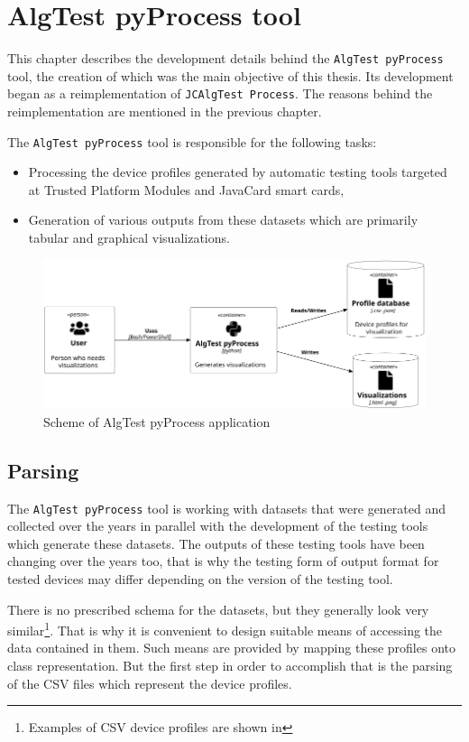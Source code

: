 \chapter{AlgTest pyProcess tool}
This chapter describes the development details behind the \texttt{AlgTest pyProcess} tool, the creation of which was the main objective of this thesis. Its development began as a reimplementation of \texttt{JCAlgTest Process}. The reasons behind the reimplementation are mentioned in the previous chapter.

The \texttt{AlgTest pyProcess} tool is responsible for the following tasks:
\begin{itemize}
    \item Processing the device profiles generated by automatic testing tools targeted at Trusted Platform Modules and JavaCard smart cards,
    \item Generation of various outputs from these datasets which are primarily tabular and graphical visualizations.
\end{itemize}
\begin{figure}[h]
    \centering
    \includegraphics[width=\textwidth]{img/scheme.png}
    \caption{Scheme of AlgTest pyProcess application}
    \label{fig:algtest-process-scheme}
\end{figure}


\section{Parsing}
The \texttt{AlgTest pyProcess} tool is working with datasets that were generated and collected over the years in parallel with the development of the testing tools which generate these datasets. The outputs of these testing tools have been changing over the years too, that is why the testing form of output format for tested devices may differ depending on the version of the testing tool.

There is no prescribed schema for the datasets, but they generally look very similar\footnote{Examples of CSV device profiles are shown in }. That is why it is convenient to design suitable means of accessing the data contained in them. Such means are provided by mapping these profiles onto class representation. But the first step in order to accomplish that is the parsing of the CSV files which represent the device profiles. 



